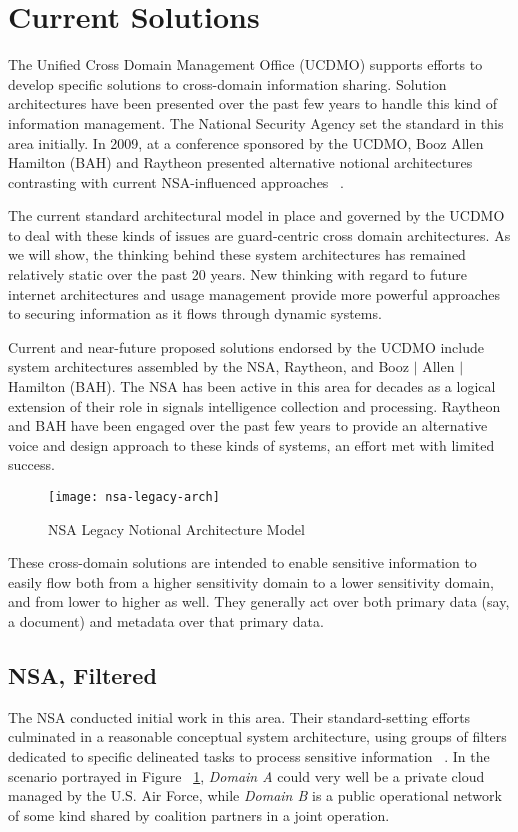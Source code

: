 \section{Current Solutions}
\label{section:current-solutions}
The Unified Cross Domain Management Office (UCDMO) supports efforts to develop specific solutions to cross-domain information sharing.  Solution architectures have been presented over the past few years to handle this kind of information management.  The National Security Agency set the standard in this area initially.  In 2009, at a conference sponsored by the UCDMO, Booz Allen Hamilton (BAH) and Raytheon presented alternative notional architectures contrasting with current NSA-influenced approaches ~\cite{proposal:nsa-arch,proposal:gig-arch,proposal:bah-arch,proposal:raytheon-arch}.

The current standard architectural model in place and governed by the UCDMO to deal with these kinds of issues are guard-centric cross domain architectures.  As we will show, the thinking behind these system architectures has remained relatively static over the past 20 years.  New thinking with regard to future internet architectures and usage management provide more powerful approaches to securing information as it flows through dynamic systems.

Current and near-future proposed solutions endorsed by the UCDMO include system architectures assembled by the NSA, Raytheon, and Booz $\mid$  Allen $\mid$  Hamilton (BAH).   The NSA has been active in this area for decades as a logical extension of their role in signals intelligence collection and processing.  Raytheon and BAH have been engaged over the past few years to provide an alternative voice and design approach to these kinds of systems, an effort met with limited success.


\begin{figure}[!t]
\centering
\texttt{[image: nsa-legacy-arch]}
\caption{NSA Legacy Notional Architecture Model}
\label{fig:model:conceptual-model}
\end{figure}

These cross-domain solutions are intended to enable sensitive information to easily flow both from a higher sensitivity domain to a lower sensitivity domain, and from lower to higher as well.  They generally act over both primary data (say, a document) and metadata over that primary data.

\subsection{NSA, Filtered}
The NSA conducted initial work in this area.  Their standard-setting efforts culminated in a reasonable conceptual system architecture, using groups of filters dedicated to specific delineated tasks to process sensitive information ~\cite{proposal:nsa-arch}. In the scenario portrayed in Figure ~\ref{fig:model:conceptual-model}, \textit{Domain A} could very well be a private cloud managed by the U.S. Air Force, while \textit{Domain B} is a public operational network of some kind shared by coalition partners in a joint operation.

